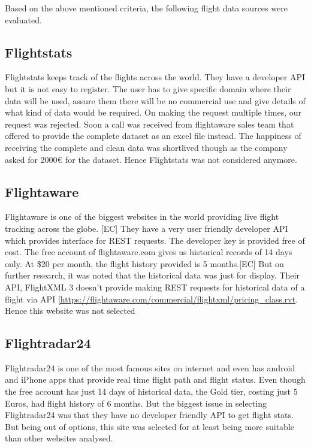 Based on the above mentioned criteria, the following flight data sources were evaluated. 
\subsection{Flightstats}
Flightstats keeps track of the flights across the world. They have a developer API but it is not easy to register. The user has to give specific domain where their data will be used, assure them there will be no commercial use and give details of what kind of data would be required. On making the request multiple times, our request was rejected. Soon a call was received from flightaware sales team that offered to provide the complete dataset as an excel file instead. The happiness of receiving the complete and clean data was shortlived though as the company asked for 2000€ for the dataset. Hence Flightstats was not considered anymore.

\subsection{Flightaware}
Flightaware is one of the biggest websites in the world providing live flight tracking across the globe. [EC] They have a very user friendly developer API which provides interface for REST requests. The developer key is provided free of cost. The free account of flightaware.com gives us historical records of 14 days only. At \$20 per month, the flight history provided is 5 months.[EC] But on further research, it was noted that  the historical data was just for display. Their API, FlightXML 3 doesn't provide making REST requests for historical data of a flight via API \url{[https://flightaware.com/commercial/flightxml/pricing_class.rvt}.
Hence this website was not selected

\subsection{Flightradar24}
Flightradar24 is one of the most famous sites on internet and even has android and iPhone apps that provide real time flight path and flight status. Even though the free account has just 14 days of historical data, the Gold tier, costing just 5 Euros, had flight history of 6 months. But the biggest issue in selecting Flightradar24 was that they have no developer friendly API to get flight stats. But being out of options, this site was selected for at least being more suitable than other websites analysed.

